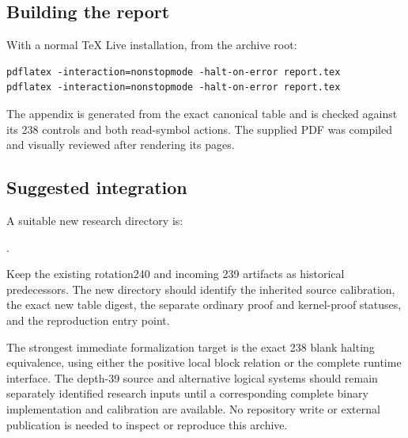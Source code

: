 \subsection{Building the report}

With a normal TeX Live installation, from the archive root:
\begin{verbatim}
pdflatex -interaction=nonstopmode -halt-on-error report.tex
pdflatex -interaction=nonstopmode -halt-on-error report.tex
\end{verbatim}
The appendix is generated from the exact canonical table and is checked
against its 238 controls and both read-symbol actions. The supplied PDF
was compiled and visually reviewed after rendering its pages.

\subsection{Suggested integration}

A suitable new research directory is:

.

Keep the existing rotation240 and incoming 239 artifacts as historical
predecessors. The new directory should identify the inherited source
calibration, the exact new table digest, the separate ordinary proof
and kernel-proof statuses, and the reproduction entry point.

The strongest immediate formalization target is the exact 238 blank
halting equivalence, using either the positive local block relation or
the complete runtime interface. The depth-39 source and alternative
logical systems should remain separately identified research inputs
until a corresponding complete binary implementation and calibration
are available. No repository write or external publication is needed
to inspect or reproduce this archive.
